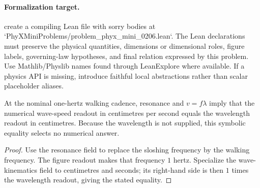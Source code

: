 \paragraph{Formalization target.}
create a compiling Lean file with sorry bodies at `PhyXMiniProblems/problem\_phyx\_mini\_0206.lean`. The Lean declarations must preserve the physical quantities, dimensions or dimensional roles, figure labels, governing-law hypotheses, and final relation expressed by this problem.
Use Mathlib/Physlib names found through LeanExplore where available. If a physics API is missing, introduce faithful local abstractions rather than scalar placeholder aliases.

\begin{theorem}
\label{thm:physics:phyx_mini_0206:target}
At the nominal one-hertz walking cadence, resonance and $v=f\lambda$ imply that the numerical wave-speed readout in centimetres per second equals the wavelength readout in centimetres.  Because the wavelength is not supplied, this symbolic equality selects no numerical answer.
\end{theorem}
\begin{proof}
Use the resonance field to replace the sloshing frequency by the walking frequency.  The figure readout makes that frequency $1$ hertz.  Specialize the wave-kinematics field to centimetres and seconds; its right-hand side is then $1$ times the wavelength readout, giving the stated equality.
\end{proof}

